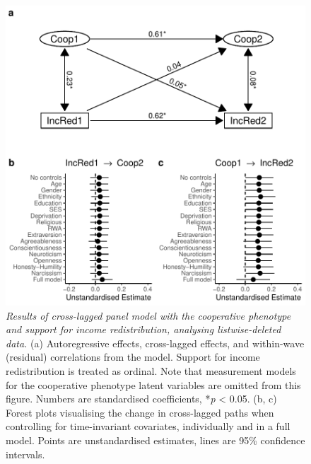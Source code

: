 \documentclass[
  man,floatsintext]{apa6}
\begin{document}
\begin{figure}
\centering
\includegraphics{manuscript_files/figure-latex/clpmPlotBIncRed-1.pdf}
\caption{\label{fig:clpmPlotBIncRed}\emph{Results of cross-lagged panel model with the
cooperative phenotype and support for income redistribution, analysing
listwise-deleted data.} (a) Autoregressive effects, cross-lagged effects, and
within-wave (residual) correlations from the model. Support for income
redistribution is treated as ordinal. Note that measurement models for the
cooperative phenotype latent variables are omitted from this figure. Numbers are
standardised coefficients, *\emph{p} \textless{} 0.05. (b, c) Forest plots visualising the
change in cross-lagged paths when controlling for time-invariant covariates,
individually and in a full model. Points are unstandardised estimates, lines are
95\% confidence intervals.}
\end{figure}

\newpage
\end{document}
